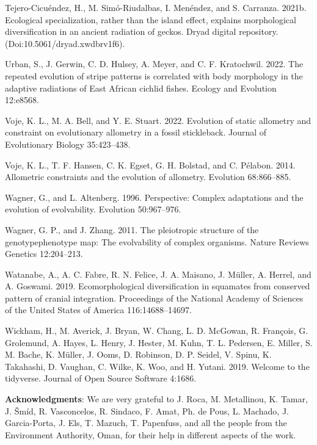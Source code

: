 \documentclass[
  11pt,
]{article}
\begin{document}
\leavevmode\hypertarget{ref-PristurusData}{}%
Tejero-Cicuéndez, H., M. Simó-Riudalbas, I. Menéndez, and S. Carranza.
2021b. Ecological specialization, rather than the island effect,
explains morphological diversification in an ancient radiation of
geckos. Dryad digital repository. (Doi:10.5061/dryad.xwdbrv1f6).

\leavevmode\hypertarget{ref-Urban2022}{}%
Urban, S., J. Gerwin, C. D. Hulsey, A. Meyer, and C. F. Kratochwil.
2022. The repeated evolution of stripe patterns is correlated with body
morphology in the adaptive radiations of East African cichlid fishes.
Ecology and Evolution 12:e8568.

\leavevmode\hypertarget{ref-Voje2022}{}%
Voje, K. L., M. A. Bell, and Y. E. Stuart. 2022. Evolution of static
allometry and constraint on evolutionary allometry in a fossil
stickleback. Journal of Evolutionary Biology 35:423--438.

\leavevmode\hypertarget{ref-Voje2014}{}%
Voje, K. L., T. F. Hansen, C. K. Egset, G. H. Bolstad, and C. Pélabon.
2014. Allometric constraints and the evolution of allometry. Evolution
68:866--885.

\leavevmode\hypertarget{ref-Wagner1996}{}%
Wagner, G., and L. Altenberg. 1996. Perspective: Complex adaptations and
the evolution of evolvability. Evolution 50:967--976.

\leavevmode\hypertarget{ref-Wagner2011}{}%
Wagner, G. P., and J. Zhang. 2011. The pleiotropic structure of the
genotypephenotype map: The evolvability of complex organisms. Nature
Reviews Genetics 12:204--213.

\leavevmode\hypertarget{ref-Watanabe2019}{}%
Watanabe, A., A. C. Fabre, R. N. Felice, J. A. Maisano, J. Müller, A.
Herrel, and A. Goswami. 2019. Ecomorphological diversification in
squamates from conserved pattern of cranial integration. Proceedings of
the National Academy of Sciences of the United States of America
116:14688--14697.

\leavevmode\hypertarget{ref-Wickham2019}{}%
Wickham, H., M. Averick, J. Bryan, W. Chang, L. D. McGowan, R. François,
G. Grolemund, A. Hayes, L. Henry, J. Hester, M. Kuhn, T. L. Pedersen, E.
Miller, S. M. Bache, K. Müller, J. Ooms, D. Robinson, D. P. Seidel, V.
Spinu, K. Takahashi, D. Vaughan, C. Wilke, K. Woo, and H. Yutani. 2019.
Welcome to the tidyverse. Journal of Open Source Software 4:1686.

\newpage

\hfill\break

\textbf{Acknowledgments}: We are very grateful to J. Roca, M.
Metallinou, K. Tamar, J. Šmíd, R. Vasconcelos, R. Sindaco, F. Amat, Ph.
de Pous, L. Machado, J. Garcia-Porta, J. Els, T. Mazuch, T. Papenfuss,
and all the people from the Environment Authority, Oman, for their help
in different aspects of the work.
\end{document}
